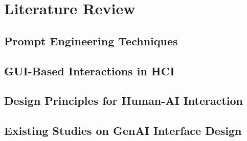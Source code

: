 
\chapter{Literature Review}\label{chapter:literature-review}

\section{Prompt Engineering Techniques}

\section{GUI-Based Interactions in HCI}

\section{Design Principles for Human-AI Interaction}

\section{Existing Studies on GenAI Interface Design}